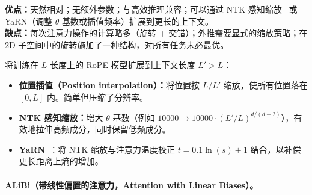 \textbf{优点：}天然相对；无额外参数；与高效推理兼容；可以通过 NTK 感知缩放~\cite{peng2023yarn} 或 YaRN（调整 $\theta$ 基数或插值频率）扩展到更长的上下文。\\

\textbf{缺点：}每次注意力操作的计算略多（旋转 + 交错）；外推需要显式的缩放策略；在 2D 子空间中的旋转施加了一种结构，对所有任务未必最优。

\begin{intuitionbox}[RoPE 长度扩展]
将训练在 $L$ 长度上的 RoPE 模型扩展到上下文长度 $L' > L$：

\begin{itemize}
  \item \textbf{位置插值（Position interpolation）：}将位置按 $L/L'$ 缩放，使所有位置落在 $[0, L]$ 内。简单但压缩了分辨率。
  \item \textbf{NTK 感知缩放：}增大 $\theta$ 基数（例如 $10000 \to 10000 \cdot (L'/L)^{d/(d-2)}$），有效地拉伸高频成分，同时保留低频成分。
  \item \textbf{YaRN}~\cite{peng2023yarn}：将 NTK 缩放与注意力温度校正 $t = 0.1 \ln(s) + 1$ 结合，以补偿更长距离上熵的增加。
\end{itemize}
\end{intuitionbox}

\paragraph{ALiBi（带线性偏置的注意力，Attention with Linear Biases）。}
\label{alibi-attention-with-linear-biases.}


